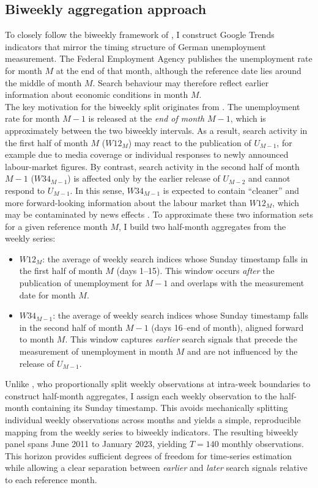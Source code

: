 \documentclass[12pt,a4paper]{article}
\begin{document}
\subsection{Biweekly aggregation approach}
To closely follow the biweekly framework of \citet{Askitas}, I construct Google Trends indicators that mirror the timing structure of German unemployment measurement. The Federal Employment Agency publishes the unemployment rate for month $M$ at the end of that month, although the reference date lies around the middle of month $M$.
Search behaviour may therefore reflect earlier information about economic conditions in month $M$.\\
The key motivation for the biweekly split originates from \citet{Askitas}. The unemployment rate for month $M{-}1$ is released at the \emph{end of month $M{-}1$}, which is approximately between the two biweekly intervals. As a result, search activity in the first half of month $M$ ($W12_M$) may react to the publication of $U_{M-1}$, for example due to media coverage or individual responses to newly announced labour-market figures. By contrast, search activity in the second half of month $M{-}1$ ($W34_{M-1}$) is affected only by the earlier release of $U_{M-2}$ and cannot respond to $U_{M-1}$. In this sense, $W34_{M-1}$ is expected to contain “cleaner” and more forward-looking information about the labour market than $W12_M$, which may be contaminated by news effects \citep{Askitas}.
To approximate these two information sets for a given reference month $M$, I build two half-month aggregates from the weekly series:
\begin{itemize}
    \item \textbf{$W12_M$}: the average of weekly search indices whose Sunday timestamp falls in the first half of month $M$ (days 1--15). This window occurs \emph{after} the publication of unemployment for $M{-}1$ and overlaps with the measurement date for month $M$.
    \item \textbf{$W34_{M-1}$}: the average of weekly search indices whose Sunday timestamp falls in the second half of month $M{-}1$ (days 16--end of month), aligned forward to month $M$. This window captures \emph{earlier} search signals that precede the measurement of unemployment in month $M$ and are not influenced by the release of $U_{M-1}$.
\end{itemize}
Unlike \citet{Askitas}, who proportionally split weekly observations at intra-week boundaries to construct half-month aggregates, I assign each weekly observation to the half-month containing its Sunday timestamp.
This avoids mechanically splitting individual weekly observations across months and yields a simple, reproducible mapping from the weekly series to biweekly indicators.
The resulting biweekly panel spans June 2011 to January 2023, yielding $T = 140$ monthly observations. This horizon provides sufficient degrees of freedom for time-series estimation while allowing a clear separation between \emph{earlier} and \emph{later} search signals relative to each reference month. 
\end{document}
